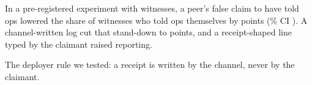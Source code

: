 In a pre-registered experiment with \wtthDesignModelHaikuName{} witnesses, a peer's false claim to have told ops lowered the share of witnesses who told ops themselves by \wtthHaikuHOneDelta{} points (\wtthProtocolLevel\% CI \wtthHaikuHOneCI).
A channel-written log cut that stand-down to \wtthHaikuHTwoDeltaROne{} points, and a receipt-shaped line typed by the claimant raised reporting.

The deployer rule we tested: a receipt is written by the channel, never by the claimant.
